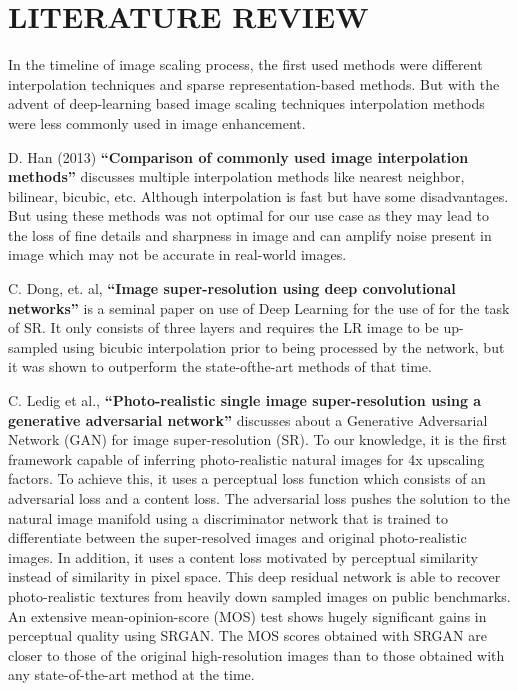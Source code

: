 \newpage
\section{LITERATURE REVIEW}
In the timeline of image scaling process, the first used methods were different interpolation techniques and sparse representation-based methods. But with the advent
of deep-learning based image scaling techniques interpolation methods were less commonly used in image enhancement.

D. Han (2013) {\bf“Comparison of commonly used image interpolation methods”} discusses multiple interpolation methods like nearest neighbor, bilinear, bicubic, etc. Although interpolation is fast but have some disadvantages. But using these methods was not optimal for our use case as they may lead to the loss of fine details and sharpness in image and can amplify noise present in image which may not be accurate in real-world images.\cite{r1}

C. Dong, et. al, {\bf“Image super-resolution using deep convolutional networks”} is a seminal paper on use of Deep Learning for the use of for the task of SR. It only consists of three layers and requires the LR image to be up-sampled using bicubic interpolation prior to being processed by the network, but it was shown to outperform the state-ofthe-art methods of that time.\cite{r2}

C. Ledig et al., {\bf“Photo-realistic single image super-resolution using a generative adversarial network”} discusses about a Generative Adversarial Network (GAN) for image super-resolution (SR). To our knowledge, it is the first framework capable of inferring photo-realistic natural images for 4x upscaling factors. To achieve this, it uses
a perceptual loss function which consists of an adversarial loss and a content loss. The adversarial loss pushes the solution to the natural image manifold using a discriminator
network that is trained to differentiate between the super-resolved images and original photo-realistic images. In addition, it uses a content loss motivated by perceptual
similarity instead of similarity in pixel space. This deep residual network is able to recover photo-realistic textures from heavily down sampled images on public
benchmarks. An extensive mean-opinion-score (MOS) test shows hugely significant gains in perceptual quality using SRGAN. The MOS scores obtained with SRGAN are
closer to those of the original high-resolution images than to those obtained with any state-of-the-art method at the time.\cite{r3}
